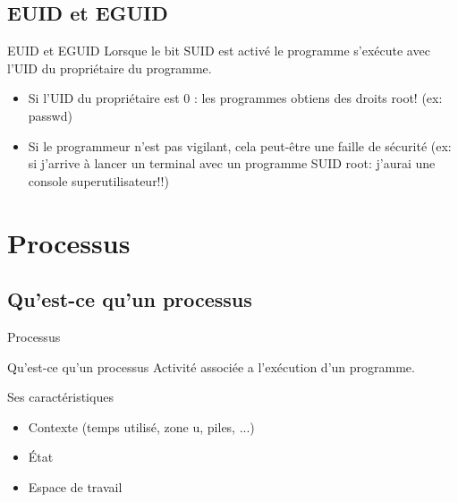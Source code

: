 \def\subsectitle{EUID et EGUID}
\subsection{\subsectitle}
\begin{frame}{\sectitle}
	\begin{block}{\subsectitle}
	Lorsque le bit SUID est activé le programme s'exécute avec l'UID du propriétaire du programme.
		\begin{itemize}
		\item Si l'UID du propriétaire est 0 : les programmes obtiens des droits root! (ex: passwd)
		\item Si le programmeur n'est pas vigilant, cela peut-être une faille de sécurité (ex: si j'arrive à lancer un terminal avec un programme SUID root: j'aurai une console superutilisateur!!)
		\end{itemize}
	\end{block}
\end{frame}

\def\sectitle{Processus}
\section{\sectitle}
\def\subsectitle{Qu'est-ce qu'un processus}
\subsection{\subsectitle}
\begin{frame}{\sectitle}
	\begin{alertblock}{\subsectitle}
	Activité associée a l'exécution d'un programme.
	\end{alertblock}
	
	\begin{block}{Ses caractéristiques}
		\begin{itemize}
		\item Contexte (temps utilisé, zone u, piles, ...)
		\item État
		\item Espace de travail
		\end{itemize}
	\end{block}
\end{frame}

\def\subsectitle{Processus et processeur}
